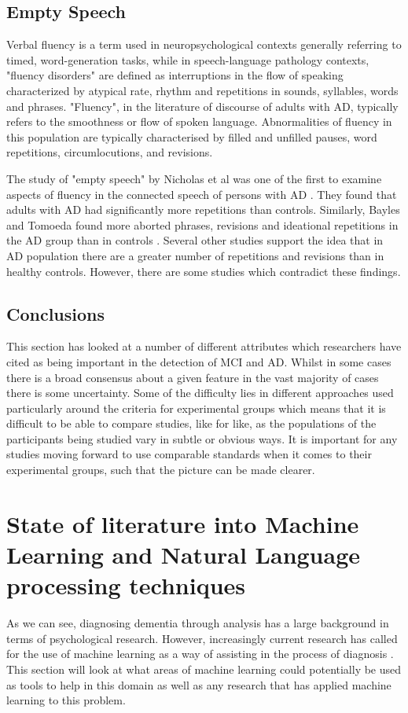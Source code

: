 \documentclass[10pt, letterpaper, twoside, openany]{book}
\begin{document}
\subsection{Empty Speech}
Verbal fluency is a term used in neuropsychological contexts generally referring to timed, word-generation tasks, while in speech-language pathology contexts, "fluency disorders" are defined as interruptions in the flow of speaking characterized by atypical rate, rhythm and repetitions in sounds, syllables, words and phrases. "Fluency", in the literature of discourse of adults with AD, typically refers to the smoothness or flow of spoken language. Abnormalities of fluency in this population are typically characterised by filled and unfilled pauses, word repetitions, circumlocutions, and revisions.
\par
The study of "empty speech" by Nicholas et al was one of the first to examine aspects of fluency in the connected speech of persons with AD \cite{Nicholas1985}. They found that adults with AD had significantly more repetitions than controls. Similarly, Bayles and Tomoeda found more aborted phrases, revisions and ideational repetitions in the AD group than in controls \cite{Bayles1983}. Several other studies support the idea that in AD population there are a greater number of repetitions and revisions than in healthy controls. However, there are some studies which contradict these findings\cite{Ahmed2013}.
\subsection{Conclusions}
This section has looked at a number of different attributes which researchers have cited as being important in the detection of MCI and AD. Whilst in some cases there is a broad consensus about a given feature in the vast majority of cases there is some uncertainty. Some of the difficulty lies in different approaches used particularly around the criteria for experimental groups which means that it is difficult to be able to compare studies, like for like, as the populations of the participants being studied vary in subtle or obvious ways. It is important for any studies moving forward to use comparable standards when it comes to their experimental groups, such that the picture can be made clearer.

\section{State of literature into Machine Learning and Natural Language processing techniques}
As we can see, diagnosing dementia through analysis has a large background in terms of psychological research. However, increasingly current research has called for the use of machine learning as a way of assisting in the process of diagnosis \cite{Boschi2017}. This section will look at what areas of machine learning could potentially be used as tools to help in this domain as well as any research that has applied machine learning to this problem.
\end{document}
